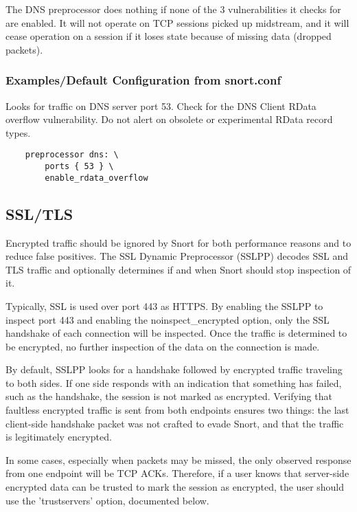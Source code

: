 \documentclass[english]{report}
\begin{document}
The DNS preprocessor does nothing if none of the 3 vulnerabilities it checks
for are enabled.  It will not operate on TCP sessions picked up midstream, and
it will cease operation on a session if it loses state because of missing data
(dropped packets).

\subsubsection{Examples/Default Configuration from snort.conf}

Looks for traffic on DNS server port 53.  Check for the DNS Client RData
overflow vulnerability.  Do not alert on obsolete or experimental RData record
types.

\begin{verbatim}
    preprocessor dns: \
        ports { 53 } \
        enable_rdata_overflow
\end{verbatim}

\subsection{SSL/TLS}
\label{sub:SSL/TLS}

Encrypted traffic should be ignored by Snort for both performance reasons and
to reduce false positives.  The SSL Dynamic Preprocessor (SSLPP) decodes SSL
and TLS traffic and optionally determines if and when Snort should stop
inspection of it.

Typically, SSL is used over port 443 as HTTPS.  By enabling the SSLPP to
inspect port 443 and enabling the noinspect\_encrypted option, only the SSL
handshake of each connection will be inspected.  Once the traffic is determined
to be encrypted, no further inspection of the data on the connection is made.

By default, SSLPP looks for a handshake followed by encrypted traffic traveling
to both sides.  If one side responds with an indication that something has
failed, such as the handshake, the session is not marked as encrypted.
Verifying that faultless encrypted traffic is sent from both endpoints ensures
two things: the last client-side handshake packet was not crafted to evade
Snort, and that the traffic is legitimately encrypted.

In some cases, especially when packets may be missed, the only observed
response from one endpoint will be TCP ACKs.  Therefore, if a user knows that
server-side encrypted data can be trusted to mark the session as encrypted, the
user should use the 'trustservers' option, documented below.
\end{document}
